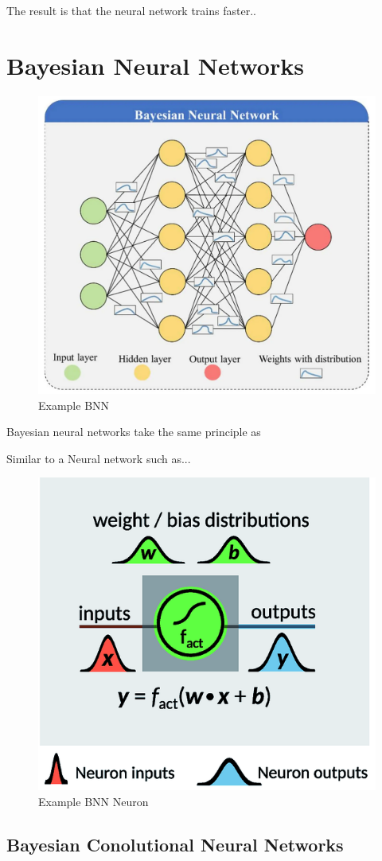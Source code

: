\documentclass[12pt]{article}
\begin{document}
The result is that the neural network trains faster..

\section{Bayesian Neural Networks}

\begin{figure}[H]
	\centering
	\includegraphics[width=.55\textwidth]{../Images/example_bnn.png}
	\caption{Example BNN  \cite{FleszarBNN}}
\end{figure}

Bayesian neural networks take the same principle as 

Similar to a Neural network such as... 

\begin{figure}[H]
	\centering
	\includegraphics[width=.55\textwidth]{../Images/BNN-neuron.png}
	\caption{Example BNN Neuron \cite{hase2019machine}}
\end{figure}

\subsection{Bayesian Conolutional Neural Networks}
\end{document}
